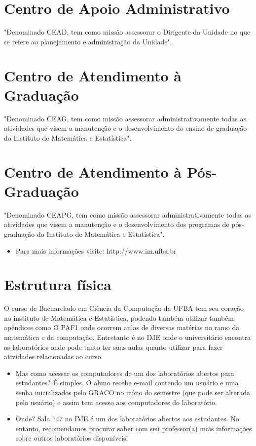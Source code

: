 \section{Centro de Apoio Administrativo}

"Denominado CEAD, tem como missão assessorar o Dirigente da Unidade no que se refere ao planejamento e administração da Unidade".\\

\section{Centro de Atendimento à Graduação}

"Denominado CEAG, tem como missão assessorar administrativamente todas as atividades que visem a manutenção e o desenvolvimento do ensino de graduação do Instituto de Matemática e Estatística".\\

\section{Centro de Atendimento à Pós-Graduação}

"Denominado CEAPG, tem como missão assessorar administrativamente todas as atividades que visem a manutenção e o desenvolvimento dos programas de pós-graduação do Instituto de Matemática e Estatística".\\
\begin{itemize}
\item Para mais informações visite: http://www.im.ufba.br 
    
\end{itemize}


\section{Estrutura física}
O curso de Bacharelado em Ciência da Computação da UFBA tem seu coração no instituto de Matemática e Estatística, podendo também utilizar também apêndices como O PAF1 onde ocorrem aulas de diversas matérias no ramo da matemática e da computação. Entretanto é no IME onde o universitário encontra os laboratórios onde pode tanto ter suas aulas quanto utilizar para fazer atividades relacionadas ao curso. 
\begin{itemize}
\item Mas como acessar os computadores de um dos laboratórios abertos para estudantes?
É simples, O aluno recebe e-mail contendo um usuário e uma senha inicializados pelo GRACO no início do semestre (que pode ser alterada pelo usuário) e assim tem acesso aos computadores do laboratório.
\item Onde?
Sala 147 no IME é um dos laboratórios abertos aos estudantes. No entanto, recomendamos procurar saber com seu professor(a) mais informações sobre outros laboratórios disponíveis!
\end{itemize}

